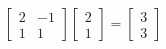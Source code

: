 \documentclass[preview]{standalone}
\begin{document}
\begin{align*}
\begin{bmatrix} 2 & -1 \\ 1 & 1 \end{bmatrix} \begin{bmatrix} 2 \\ 1 \end{bmatrix} = \begin{bmatrix} 3 \\ 3 \end{bmatrix}
\end{align*}
\end{document}
